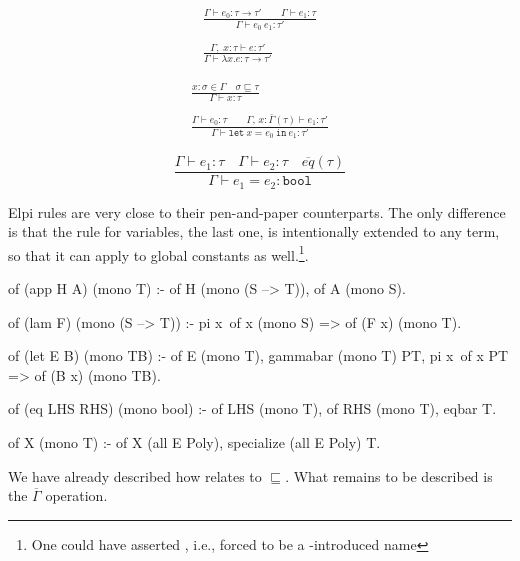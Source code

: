 \documentclass[a4paper, 11pt]{book}
\begin{document}
\begin{center}
\begin{minipage}{0.45\textwidth}
$$
\begin{array}{cl}
  \displaystyle\frac{\Gamma \vdash e_0:\tau \rightarrow \tau' \quad\quad \Gamma \vdash e_1 : \tau }{\Gamma \vdash e_0\ e_1 : \tau'}\\ \\
  \displaystyle\frac{\Gamma,\;x:\tau\vdash e:\tau'}{\Gamma \vdash \lambda x.e : \tau \rightarrow \tau'}
\end{array}
  $$
\end{minipage}
\begin{minipage}{0.45\textwidth}
$$
\begin{array}{cl}
  \displaystyle\frac{x:\sigma \in \Gamma \quad \sigma \sqsubseteq \tau}{\Gamma \vdash x:\tau}\\ \\
  \displaystyle\frac{\Gamma \vdash e_0:\tau \quad\quad \Gamma,\,x:\bar{\Gamma}(\tau) \vdash e_1:\tau'}{\Gamma \vdash \mathtt{let}\ x = e_0\ \mathtt{in}\ e_1 :  \tau'}
  \end{array}
$$
\end{minipage}
$$ 
\displaystyle\frac{\Gamma \vdash e_1 : \tau \quad \Gamma \vdash e_2 : \tau \quad \overline{eq}(\tau)}{\Gamma \vdash e_1 = e_2: \mathtt{bool}}
$$
\end{center}


Elpi rules are very close to their pen-and-paper counterparts. The only
difference is that the rule for variables, the last one,
is intentionally extended to any term, so that it can apply to global
constants as well.\footnote{One could have asserted , i.e.,
forced  to be a -introduced name}.

\begin{elpicode}
of (app H A) (mono T) :-
  of H (mono (S --> T)),
  of A (mono S).

of (lam F) (mono (S --> T)) :-
  pi x\ of x (mono S) => of (F x) (mono T).

of (let E B) (mono TB) :-
  of E (mono T),
  gammabar (mono T) PT,
  pi x\ of x PT => of (B x) (mono TB).

of (eq LHS RHS) (mono bool) :-
  of LHS (mono T),
  of RHS (mono T),
  eqbar T.

of X (mono T) :- of X (all E Poly), specialize (all E Poly) T.
\end{elpicode}

\noindent
We have already described how  relates to $\sqsubseteq$.
What remains to be described is the $\overline{\Gamma}$ operation.
\end{document}
